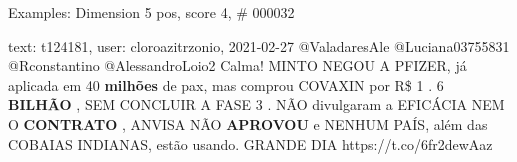 \begin{frame}{Examples: Dimension 5 pos, score 4, \# 000032}
\footnotesize
\begin{exampleblock}{text: t124181, user: cloroazitrzonio, 2021-02-27}
@ValadaresAle @Luciana03755831 @Rconstantino @AlessandroLoio2 Calma! MINTO 
NEGOU A PFIZER, já aplicada em 40 \textbf{milhões} de pax, mas comprou COVAXIN 
por R\$ 1 . 6 \textbf{BILHÃO} , SEM CONCLUIR A FASE 3 . NÃO divulgaram a 
EFICÁCIA NEM O \textbf{CONTRATO} , ANVISA NÃO \textbf{APROVOU} e NENHUM PAÍS, 
além das COBAIAS INDIANAS, estão usando. GRANDE DIA 
 https://t.co/6fr2dewAaz 
\end{exampleblock}
\end{frame}

